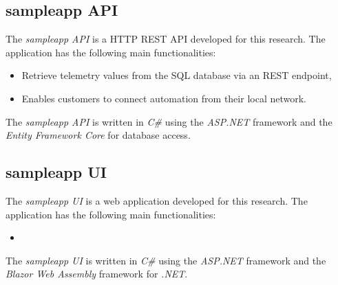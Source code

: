 \subsection{sampleapp API} \label{sec:api}
The \textit{sampleapp API} is a \ac{HTTP} \ac{REST} \ac{API} developed for this
research. The application has the following main functionalities:

\begin{itemize}
    \item Retrieve telemetry values from the \ac{SQL} database via an
    \ac{REST} endpoint,
    \item Enables customers to connect automation from their local network.
\end{itemize}
The \textit{sampleapp API} is written in \textit{C\#} using the \textit{ASP.NET}
framework and the \textit{Entity Framework Core} for database access.

\subsection{sampleapp UI} \label{sec:ui}
The \textit{sampleapp UI} is a web application developed for this research.
The application has the following main functionalities:

\begin{itemize}
    \item
\end{itemize}
The \textit{sampleapp UI} is written in \textit{C\#} using the \textit{ASP.NET}
framework and the \textit{Blazor Web Assembly} framework for \textit{.NET}.

